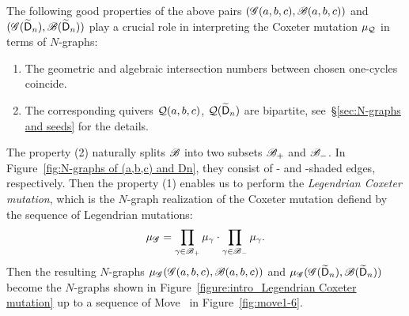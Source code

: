 The following good properties of the above pairs $(\mathscr{G}(a,b,c),\mathscr{B}(a,b,c))$ and $(\mathscr{G}(\widetilde{\mathsf{D}}_{n}),\mathscr{B}(\widetilde{\mathsf{D}}_{n}))$ play a crucial role in interpreting the Coxeter mutation $\mu_{\mathcal{Q}}$ in terms of $N$-graphs:
\begin{enumerate}
\item The geometric and algebraic intersection numbers between chosen one-cycles coincide. 
\item The corresponding quivers $\mathcal{Q}(a,b,c)$, $\mathcal{Q}(\widetilde{\mathsf{D}}_n)$ are bipartite, see~\S\ref{sec:N-graphs and seeds} for the details. 
\end{enumerate}
The property (2) naturally splits $\mathscr{B}$ into two subsets $\mathscr{B}_+$ and $\mathscr{B}_-$.
In Figure~\ref{fig:N-graphs of (a,b,c) and Dn}, they consist of \colorbox{cyclecolor1!50!}{\cyclecolornamefirst}- and \colorbox{cyclecolor2!50!}{\cyclecolornamesecond}-shaded edges, respectively. 
Then the property (1) enables us to perform the \emph{Legendrian Coxeter mutation}, which is the $N$-graph realization of the Coxeter mutation defiend by the sequence of Legendrian mutations:
\[
\mu_\mathscr{G}=\prod_{\gamma \in \mathscr{B}_+} \mu_{\gamma}\cdot\prod_{\gamma\in \mathscr{B}_-} \mu_{\gamma}.
\]
Then the resulting $N$-graphs $\mu_\mathscr{G}(\mathscr{G}(a,b,c),\mathscr{B}(a,b,c))$ and $\mu_\mathscr{G}(\mathscr{G}(\widetilde{\mathsf{D}}_n),\mathscr{B}(\widetilde{\mathsf{D}}_n))$ become the
$N$-graphs shown in Figure~\ref{figure:intro_Legendrian Coxeter mutation} up to a sequence of Move~ in Figure~\ref{fig:move1-6}.
